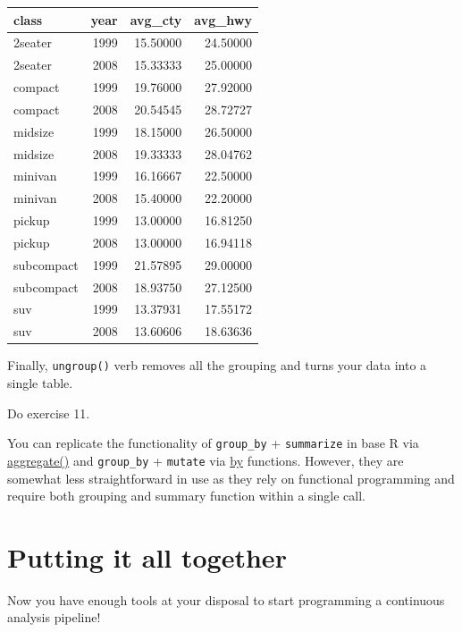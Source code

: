 \documentclass[
]{book}
\begin{document}
\begin{tabular}{l|r|r|r}
\hline
class & year & avg\_cty & avg\_hwy\\
\hline
2seater & 1999 & 15.50000 & 24.50000\\
\hline
2seater & 2008 & 15.33333 & 25.00000\\
\hline
compact & 1999 & 19.76000 & 27.92000\\
\hline
compact & 2008 & 20.54545 & 28.72727\\
\hline
midsize & 1999 & 18.15000 & 26.50000\\
\hline
midsize & 2008 & 19.33333 & 28.04762\\
\hline
minivan & 1999 & 16.16667 & 22.50000\\
\hline
minivan & 2008 & 15.40000 & 22.20000\\
\hline
pickup & 1999 & 13.00000 & 16.81250\\
\hline
pickup & 2008 & 13.00000 & 16.94118\\
\hline
subcompact & 1999 & 21.57895 & 29.00000\\
\hline
subcompact & 2008 & 18.93750 & 27.12500\\
\hline
suv & 1999 & 13.37931 & 17.55172\\
\hline
suv & 2008 & 13.60606 & 18.63636\\
\hline
\end{tabular}

Finally, \texttt{ungroup()} verb removes all the grouping and turns your data into a single table.

Do exercise 11.

You can replicate the functionality of \texttt{group\_by} + \texttt{summarize} in base R via \href{https://stat.ethz.ch/R-manual/R-patched/library/stats/html/aggregate.html}{aggregate()} and \texttt{group\_by} + \texttt{mutate} via \href{https://stat.ethz.ch/R-manual/R-patched/library/base/html/by.html}{by} functions. However, they are somewhat less straightforward in use as they rely on functional programming and require both grouping and summary function within a single call.

\hypertarget{putting-it-all-together}{%
\section{Putting it all together}\label{putting-it-all-together}}

Now you have enough tools at your disposal to start programming a continuous analysis pipeline!
\end{document}
